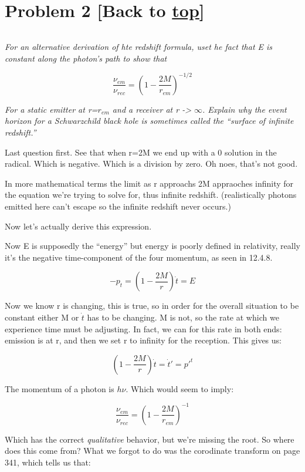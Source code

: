 \documentclass[landscape,letterpaper,10pt,english]{article}
\begin{document}
    \hypertarget{problem-2-back-to-top}{%
\section{\texorpdfstring{Problem 2 {[}Back to
\hyperref[toc]{top}{]}}{Problem 2 {[}Back to {]}}}\label{problem-2-back-to-top}}

\[\label{P2}\]

\emph{For an alternative derivation of hte redshift formula, uset he
fact that E is constant along the photon's path to show that}

\[ \frac{\nu_{em}}{\nu_{rec}} = \left( 1-\frac{2M}{r_{em}} \right)^{-1/2} \]

\emph{For a static emitter at r=\(r_{em}\) and a receiver at r
-\textgreater{} \(\infty\). Explain why the event horizon for a
Schwarzchild black hole is sometimes called the ``surface of infinite
redshift.''}

Last question first. See that when r=2M we end up with a 0 solution in
the radical. Which is negative. Which is a division by zero. Oh noes,
that's not good.

In more mathematical terms the limit as r approachs 2M appraoches
infinity for the equation we're trying to solve for, thus infinite
redshift. (realistically photons emitted here can't escape so the
infinite redshift never occurs.)

Now let's actually derive this expression.

    Now E is supposedly the ``energy'' but energy is poorly defined in
relativity, really it's the negative time-component of the four
momentum, as seen in 12.4.8.

\[ -p_t = \left( 1-\frac{2M}{r} \right) \dot t = E \]

Now we know r is changing, this is true, so in order for the overall
situation to be constant either M or \(\dot t\) has to be changing. M is
not, so the rate at which we experience time must be adjusting. In fact,
we can for this rate in both ends: emission is at r, and then we set r
to infinity for the reception. This gives us:

\[ \left( 1-\frac{2M}{r} \right) \dot t  = \dot t' = p'^t\]

    The momentum of a photon is \(h\nu\). Which would seem to imply:

\[ \frac{\nu_{em}}{\nu_{rec}} = \left( 1-\frac{2M}{r_{em}} \right)^{-1} \]

Which has the correct \emph{qualitative} behavior, but we're missing the
root. So where does this come from? What we forgot to do was the
corodinate transform on page 341, which tells us that:
\end{document}
